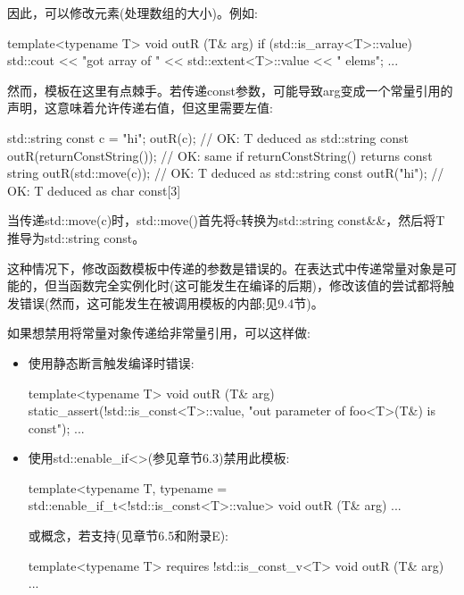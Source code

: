 因此，可以修改元素(处理数组的大小)。例如:

\begin{cpp}
template<typename T>
void outR (T& arg) {
	if (std::is_array<T>::value) {
		std::cout << "got array of " << std::extent<T>::value << " elems\n";
	}
	...
}
\end{cpp}

然而，模板在这里有点棘手。若传递const参数，可能导致arg变成一个常量引用的声明，这意味着允许传递右值，但这里需要左值:

\begin{cpp}
std::string const c = "hi";
outR(c); // OK: T deduced as std::string const
outR(returnConstString()); // OK: same if returnConstString() returns const string
outR(std::move(c)); // OK: T deduced as std::string const
outR("hi"); // OK: T deduced as char const[3]
\end{cpp}

\begin{notice}当传递std::move(c)时，std::move()首先将c转换为std::string const\&\&，然后将T推导为std::string const。
\end{notice}

这种情况下，修改函数模板中传递的参数是错误的。在表达式中传递常量对象是可能的，但当函数完全实例化时(这可能发生在编译的后期)，修改该值的尝试都将触发错误(然而，这可能发生在被调用模板的内部;见9.4节)。

如果想禁用将常量对象传递给非常量引用，可以这样做:

\begin{itemize}
\item 
使用静态断言触发编译时错误:

\begin{cpp}
template<typename T>
void outR (T& arg) {
	static_assert(!std::is_const<T>::value,
				  "out parameter of foo<T>(T&) is const");
	...
}
\end{cpp}

\item 
使用std::enable\_if<>(参见章节6.3)禁用此模板:

\begin{cpp}
template<typename T,
		 typename = std::enable_if_t<!std::is_const<T>::value>
void outR (T& arg) {
	...
}
\end{cpp}

或概念，若支持(见章节6.5和附录E):

\begin{cpp}
template<typename T>
requires !std::is_const_v<T>
void outR (T& arg) {
	...
}
\end{cpp}

\end{itemize}

